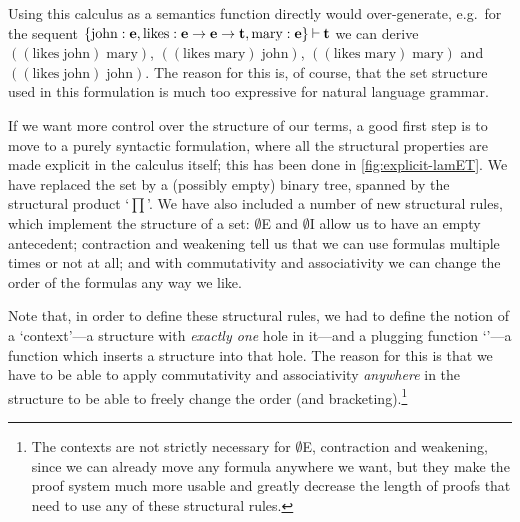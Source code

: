 %

Using this calculus as a semantics function directly would
over-generate, e.g.\ for the sequent $\{\text{john}:\mathbf{e},
\text{likes}:\mathbf{e}\rightarrow\mathbf{e}\rightarrow\mathbf{t}, \text{mary}:\mathbf{e}\}\mathbin{\vdash}\mathbf{t}$ we can derive
$((\text{likes}\; \text{john})\; \text{mary})$, $((\text{likes}\;
\text{mary})\; \text{john})$, $((\text{likes}\; \text{mary})\;
\text{mary})$ and $((\text{likes}\; \text{john})\; \text{john})$.
The reason for this is, of course, that the set structure used in this
formulation is much too expressive for natural language grammar.

If we want more control over the structure of our terms, a good first
step is to move to a purely syntactic formulation, where all the
structural properties are made explicit in the calculus itself; this
has been done in \autoref{fig:explicit-lamET}. We have
replaced the set by a (possibly empty) binary tree, spanned by the
structural product `$\prod$'. We have also included a number of new
structural rules, which implement the structure of a set: $\emptyset$E
and $\emptyset$I allow us to have an empty antecedent; contraction and
weakening tell us that we can use formulas multiple times or not at
all; and with commutativity and associativity we can change the order
of the formulas any way we like.



Note that, in order to define these structural rules, we had to define
the notion of a `context'---a structure with \emph{exactly one} hole
in it---and a plugging function `\plug'---a function which inserts a
structure into that hole. The reason for this is that we have to be
able to apply commutativity and associativity \emph{anywhere} in the
structure to be able to freely change the order (and
bracketing).\footnote{%
  The contexts are not strictly necessary for $\emptyset$E,
  contraction and weakening, since we can already move any formula
  anywhere we want, but they make the proof system much more usable
  and greatly decrease the length of proofs that need to use any of
  these structural rules.
}

